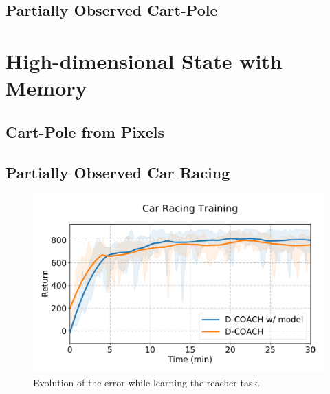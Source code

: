 \subsection{Partially Observed Cart-Pole}

\section{High-dimensional State with Memory}
\subsection{Cart-Pole from Pixels}
\subsection{Partially Observed Car Racing}

\begin{figure}[t]
    \centering
    \includegraphics[width=0.9\linewidth]{imagenes/cap3/car_racing_lstm.pdf}
    \caption{Evolution of the error while learning the reacher task. }
    \label{fig:reacher_exp}
\end{figure}